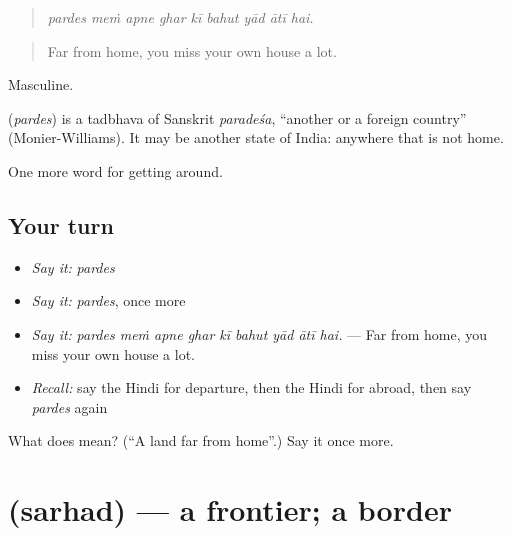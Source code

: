 \begin{quote}
        
\end{quote}

\begin{quote}
\emph{pardes meṁ apne ghar kī bahut yād ātī hai.}
\end{quote}

\begin{quote}
Far from home, you miss your own house a lot.
\end{quote}

Masculine.

\begin{cousinweb}
\textbf{} (\emph{pardes}) is a tadbhava of Sanskrit \emph{paradeśa}, \textquotedblleft{}another or a foreign country\textquotedblright{} (Monier-Williams). It may be another state of India: anywhere that is not home.
\end{cousinweb}

\begin{grammarlens}[title={What you've built}]
One more word for getting around.
\end{grammarlens}

\subsection*{Your turn}
\begin{itemize}
\raggedright
  \item \emph{Say it:} \emph{pardes}
  \item \emph{Say it:} \emph{pardes}, once more
  \item \emph{Say it:} \emph{pardes meṁ apne ghar kī bahut yād ātī hai.} — Far from home, you miss your own house a lot.
  \item \emph{Recall:} say the Hindi for departure, then the Hindi for abroad, then say \emph{pardes} again
\end{itemize}

\begin{tcolorbox}[breakable,colback=teal!4,colframe=teal!35!black,title={Before you move on}]
What does  mean? (\textquotedblleft{}A land far from home\textquotedblright{}.) Say it once more.
\end{tcolorbox}
\section[\texorpdfstring{\hi{सरहद} (sarhad)}{सरहद (sarhad)}]{ (sarhad) — a frontier; a border}

